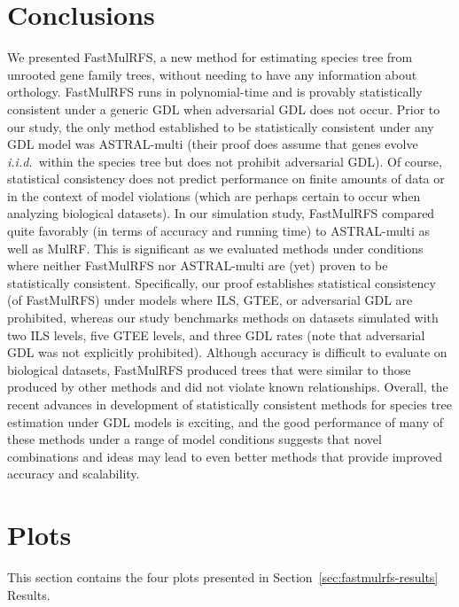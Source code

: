 \section{Conclusions}
\label{sec:conclusions}
We presented FastMulRFS, a new method for estimating species tree from unrooted gene family trees, without needing to have any information about orthology.
FastMulRFS runs in polynomial-time and is provably statistically consistent under a generic GDL when adversarial GDL does not occur.
Prior to our study, the only method established to be statistically consistent under any GDL model was ASTRAL-multi (their proof does assume that genes evolve {\em i.i.d.}~within the species tree but does not prohibit adversarial GDL).
Of course, statistical consistency does not predict performance on finite amounts of data or in the context of model violations (which are perhaps certain to occur when analyzing biological datasets).
In our simulation study, FastMulRFS compared quite favorably (in terms of accuracy and running time) to ASTRAL-multi as well as MulRF.
This is significant as we evaluated methods under conditions where neither FastMulRFS nor ASTRAL-multi are (yet) proven to be statistically consistent. 
Specifically, our proof establishes statistical consistency (of FastMulRFS) under models where ILS, GTEE, or adversarial GDL are prohibited, whereas our study benchmarks methods on datasets simulated with two ILS levels, five GTEE levels, and three GDL rates (note that adversarial GDL was not explicitly prohibited).
Although accuracy is difficult to evaluate on biological datasets, FastMulRFS produced trees that were similar to those produced by other methods and did not violate known relationships.
Overall, the recent advances in development of statistically consistent methods for species tree estimation under GDL models is exciting, and the good performance of many of these methods under a range of model conditions suggests that novel combinations and ideas may lead to even better methods that provide improved accuracy and scalability.

\clearpage

\section{Plots}
\label{sec:fastmulrfs-plots}
This section contains the four plots presented in Section~\ref{sec:fastmulrfs-results} Results. 

\vspace{12pt}

